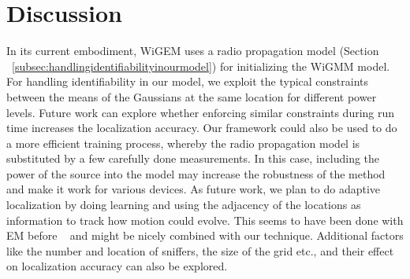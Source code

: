 
\section{Discussion}
\label{sec:discussion}

{\color{red}

In its current embodiment, WiGEM uses a radio propagation model (Section ~\ref{subsec:handlingidentifiabilityinourmodel}) for initializing the WiGMM model. For handling identifiability in our model, we exploit the typical constraints between the means of the Gaussians at the same location for different power levels. Future work can explore whether enforcing similar  constraints during run time increases the localization accuracy. Our framework could also be used to do a more efficient training process, whereby the radio propagation model is substituted by a few carefully done measurements. In this case, including the power of the source into the model may increase the robustness of the method and make it work for various devices. As future work, we plan to do adaptive localization by doing learning and using the adjacency of the locations as information to track how motion could evolve. This seems to have been done with EM before ~\cite{Addesso:2010:ALT:1856330.1856381} and might be nicely combined with our technique. Additional factors like the number and location of sniffers, the size of the grid etc., and their effect on localization accuracy can also be explored.   


}
